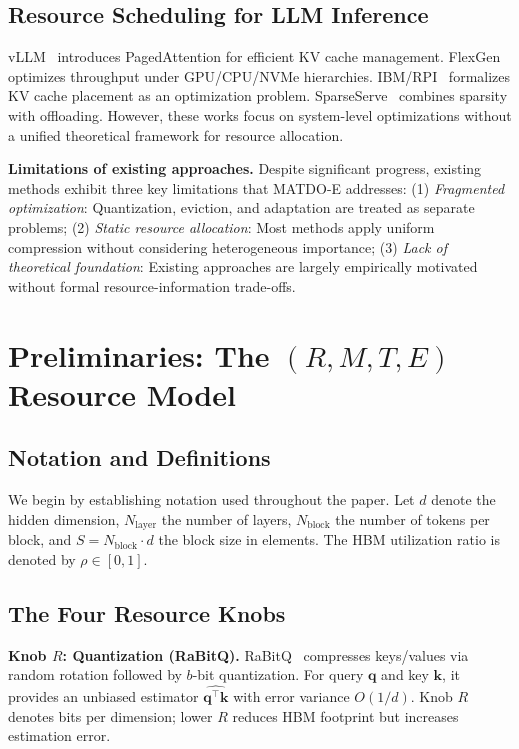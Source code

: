 \documentclass[11pt,a4paper]{article}
\theoremstyle{plain}
\theoremstyle{definition}
\begin{document}
\subsection{Resource Scheduling for LLM Inference}
vLLM~\cite{kwon2023} introduces PagedAttention for efficient KV cache management. FlexGen~\cite{sheng2023} optimizes throughput under GPU/CPU/NVMe hierarchies. IBM/RPI~\cite{fang2025} formalizes KV cache placement as an optimization problem. SparseServe~\cite{zhou2025} combines sparsity with offloading. However, these works focus on system-level optimizations without a unified theoretical framework for resource allocation.

\textbf{Limitations of existing approaches.} Despite significant progress, existing methods exhibit three key limitations that MATDO-E addresses: (1) \textit{Fragmented optimization}: Quantization, eviction, and adaptation are treated as separate problems; (2) \textit{Static resource allocation}: Most methods apply uniform compression without considering heterogeneous importance; (3) \textit{Lack of theoretical foundation}: Existing approaches are largely empirically motivated without formal resource-information trade-offs.

\section{Preliminaries: The $(R,M,T,E)$ Resource Model}
\label{sec:model}

\subsection{Notation and Definitions}
We begin by establishing notation used throughout the paper. Let $d$ denote the hidden dimension, $N_{\text{layer}}$ the number of layers, $N_{\text{block}}$ the number of tokens per block, and $S = N_{\text{block}} \cdot d$ the block size in elements. The HBM utilization ratio is denoted by $\rho \in [0,1]$.

\subsection{The Four Resource Knobs}

\textbf{Knob $R$: Quantization (RaBitQ).} RaBitQ~\cite{gao2024rabitq,gao2025rabitq} compresses keys/values via random rotation followed by $b$-bit quantization. For query $\mathbf{q}$ and key $\mathbf{k}$, it provides an unbiased estimator $\widehat{\mathbf{q}^\top \mathbf{k}}$ with error variance $O(1/d)$. Knob $R$ denotes bits per dimension; lower $R$ reduces HBM footprint but increases estimation error.
\end{document}
